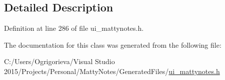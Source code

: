 \subsection{Detailed Description}


Definition at line 286 of file ui\+\_\+mattynotes.\+h.



The documentation for this class was generated from the following file\+:\begin{DoxyCompactItemize}
\item 
C\+:/\+Users/\+Ogrigorieva/\+Visual Studio 2015/\+Projects/\+Personal/\+Matty\+Notes/\+Generated\+Files/\hyperlink{ui__mattynotes_8h}{ui\+\_\+mattynotes.\+h}\end{DoxyCompactItemize}
